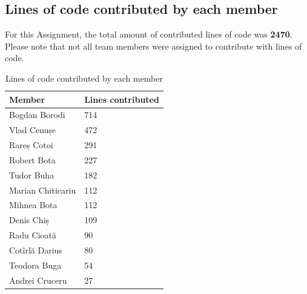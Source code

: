\documentclass[9pt,a4paper,twocolumn,twoside]{tau-class/tau}
\begin{document}
\subsection{Lines of code contributed by each member}
For this Assignment, the total amount of contributed lines of code was \textbf{2470}. Please note that not all team members were assigned to contribute with lines of code.
    \begin{table}[H]
        \centering
        \caption{Lines of code contributed by each member}
        \label{tab:table}
        \begin{tabular}{ll}
            \toprule
            \textbf{Member} & \textbf{Lines contributed} \\
            \midrule
            Bogdan Borodi & 714 \\
            Vlad Cenușe & 472 \\
            Rareș Cotoi & 291 \\
            Robert Bota & 227 \\
            Tudor Buha & 182 \\
            Marian Chiticariu & 112 \\
            Mihnea Bota & 112 \\
            Denis Chiș & 109 \\
            Radu Cioată & 90 \\
            Cotîrlă Darius & 80 \\
            Teodora Buga & 54 \\
            Andrei Cruceru & 27\\
            \bottomrule   
        \end{tabular}
        
    \end{table}
\end{document}
